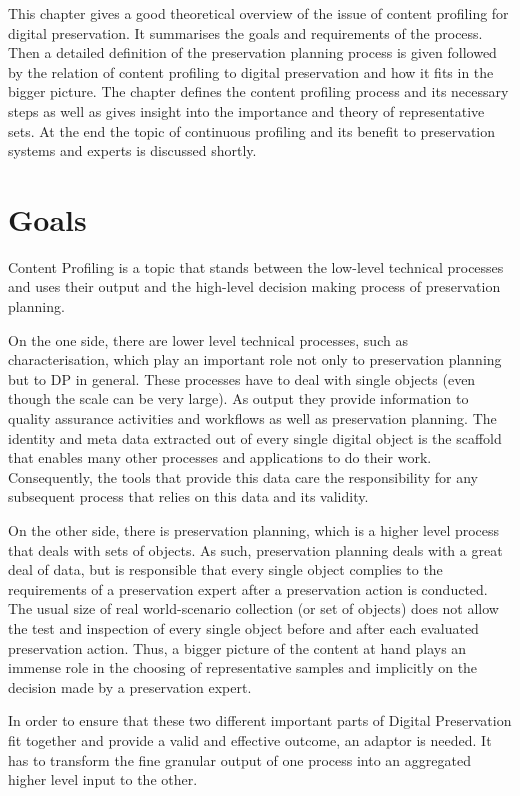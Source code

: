 This chapter gives a good theoretical overview of the issue of content profiling for digital preservation. It summarises the goals and requirements of the process. Then a detailed definition of the preservation planning process is given followed by the relation of content profiling to digital preservation and how it fits in the bigger picture. The chapter defines the content profiling process and its necessary steps as well as gives insight into the importance and theory of representative sets. At the end the topic of continuous profiling and its benefit to preservation systems and experts is discussed shortly.

\section {Goals}
\label{sec:goals}
Content Profiling is a topic that stands between the low-level technical processes and uses their output and the high-level decision making process of preservation planning.

On the one side, there are lower level technical processes, such as characterisation, which play an important role not only to preservation planning but to DP in general. These processes have to deal with single objects (even though the scale can be very large). As output they provide information to quality assurance activities and workflows as well as preservation planning. The identity and meta data extracted out of every single digital object is the scaffold that enables many other processes and applications to do their work. Consequently, the tools that provide this data care the responsibility for any subsequent process that relies on this data and its validity.

On the other side, there is preservation planning, which is a higher level process that deals with sets of objects. As such, preservation planning deals with a great deal of data, but is responsible that every single object complies to the requirements of a preservation expert after a preservation action is conducted. The usual size of real world-scenario collection (or set of objects) does not allow the test and inspection of every single object before and after each evaluated preservation action. Thus, a bigger picture of the content at hand plays an immense role in the choosing of representative samples and implicitly on the decision made by a preservation expert.

In order to ensure that these two different important parts of Digital Preservation fit together and provide a valid and effective outcome, an adaptor is needed. It has to transform the fine granular output of one process into an aggregated higher level input to the other.

